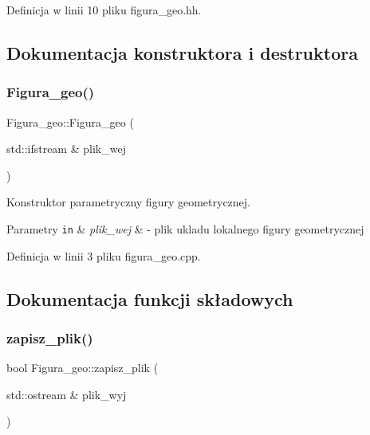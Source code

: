 Definicja w linii 10 pliku figura\+\_\+geo.\+hh.



\subsection{Dokumentacja konstruktora i destruktora}
\mbox{\label{class_figura__geo_ab50d6546e1c8307aa8a0140da3c99c46}} 
\subsubsection{\texorpdfstring{Figura\+\_\+geo()}{Figura\_geo()}}
{\footnotesize\ttfamily Figura\+\_\+geo\+::\+Figura\+\_\+geo (\begin{DoxyParamCaption}\item[{std\+::ifstream \&}]{plik\+\_\+wej }\end{DoxyParamCaption})}



Konstruktor parametryczny figury geometrycznej. 


\begin{DoxyParams}[1]{Parametry}
\mbox{\tt in}  & {\em plik\+\_\+wej} & -\/ plik ukladu lokalnego figury geometrycznej \\
\hline
\end{DoxyParams}


Definicja w linii 3 pliku figura\+\_\+geo.\+cpp.



\subsection{Dokumentacja funkcji składowych}
\mbox{\label{class_figura__geo_a483685b8109e5413d4f67eda90990e09}} 
\subsubsection{\texorpdfstring{zapisz\+\_\+plik()}{zapisz\_plik()}}
{\footnotesize\ttfamily bool Figura\+\_\+geo\+::zapisz\+\_\+plik (\begin{DoxyParamCaption}\item[{std\+::ostream \&}]{plik\+\_\+wyj }\end{DoxyParamCaption})}



